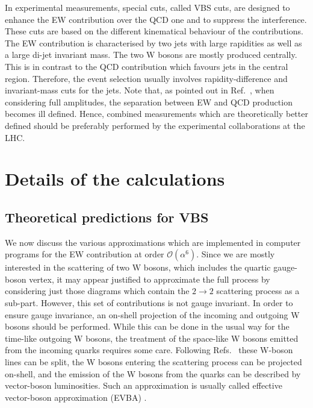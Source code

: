 \documentclass[twocolumn,epjc3]{svjour3} %
\newcommand{\PW}{\ensuremath{\text{W}}\xspace}
\begin{document}
In experimental measurements, special cuts, called VBS cuts, are designed to enhance the EW contribution over the QCD one and to suppress the interference.
These cuts are based on the different kinematical behaviour of the contributions.
The EW contribution is characterised by two jets with large rapidities as well as a large di-jet invariant mass.
The two $\PW$ bosons are mostly produced centrally.
This is in contrast to the QCD contribution which favours jets in the central region.
Therefore, the event selection usually involves rapidity-difference and invariant-mass cuts for the jets.
Note that, as pointed out in Ref.~\cite{Biedermann:2017bss}, when considering full amplitudes, the separation between EW and QCD production becomes ill
defined.
Hence, combined measurements which are theoretically better defined should be preferably performed by the experimental collaborations at the LHC.


\section{Details of the calculations}
    \label{sec:details}
    \subsection{Theoretical predictions for VBS}
    We now discuss the various approximations which are implemented in computer programs for the EW contribution at order $\mathcal{O}{\left(\alpha^{6}\right)}$.
    Since we are mostly interested in 
    the scattering of two $\PW$ bosons, which includes the quartic gauge-boson vertex, it may appear justified to approximate the 
    full process by considering just those diagrams which contain the $2\rightarrow 2$ scattering process as a sub-part.
    However, this set of contributions is not gauge invariant.
    In order to ensure gauge invariance, an on-shell projection of
    the incoming and outgoing W bosons should be performed.
    While this can be done in the usual way for the time-like
    outgoing W bosons, the treatment of the space-like W bosons
    emitted from the incoming quarks requires some care.
    Following Refs.~\cite{Kuss:1995yv,Accomando:2006hq} these W-boson lines can be split,
    the W bosons entering the scattering process can be projected
    on-shell, and the emission of the W bosons from the quarks can be
    described by vector-boson luminosities.
    Such an approximation is usually called effective vector-boson
    approximation (EVBA) \cite{Dawson:1984gx,Duncan:1985vj,Cahn:1983ip}.
\end{document}
